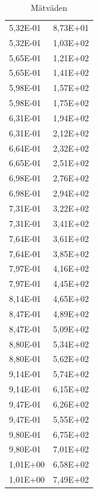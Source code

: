 \documentclass[11p, titlepage, oneside, a4paper]{article}
\begin{document}
\begin{table}
\begin{tabular}{ll}
                5,32E-01 & 8,73E+01 \\
                5,32E-01 & 1,03E+02 \\
                5,65E-01 & 1,21E+02 \\
                5,65E-01 & 1,41E+02 \\
                5,98E-01 & 1,57E+02 \\
                5,98E-01 & 1,75E+02 \\
                6,31E-01 & 1,94E+02 \\
                6,31E-01 & 2,12E+02 \\
                6,64E-01 & 2,32E+02 \\
                6,65E-01 & 2,51E+02 \\
                6,98E-01 & 2,76E+02 \\
                6,98E-01 & 2,94E+02 \\
                7,31E-01 & 3,22E+02 \\
                7,31E-01 & 3,41E+02 \\
                7,64E-01 & 3,61E+02 \\
                7,64E-01 & 3,85E+02 \\
                7,97E-01 & 4,16E+02 \\
                7,97E-01 & 4,45E+02 \\
                8,14E-01 & 4,65E+02 \\
                8,47E-01 & 4,89E+02 \\
                8,47E-01 & 5,09E+02 \\
                8,80E-01 & 5,34E+02 \\
                8,80E-01 & 5,62E+02 \\
                9,14E-01 & 5,74E+02 \\
                9,14E-01 & 6,15E+02 \\
                9,47E-01 & 6,26E+02 \\
                9,47E-01 & 5,55E+02 \\
                9,80E-01 & 6,75E+02 \\
                9,80E-01 & 7,01E+02 \\
                1,01E+00 & 6,58E+02 \\
                1,01E+00 & 7,49E+02 \\
                \bottomrule
            \end{tabular}
            \caption{Mätväden}
            \label{table:result}
        \end{table}
\end{document}
